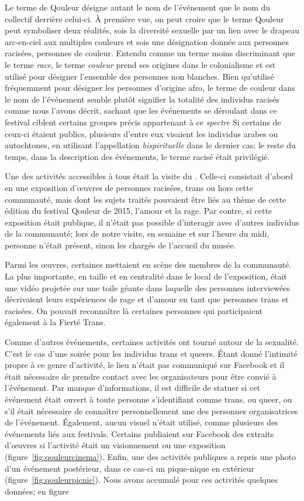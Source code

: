 Le terme de Qouleur désigne autant le nom de l'événement que le nom du collectif derrière celui-ci.
À première vue, on peut croire que le terme Qouleur peut symboliser deux réalités, sois la diversité sexuelle par un lien avec le drapeau arc-en-ciel aux multiples couleurs et sois une désignation donnée aux personnes racisées, personnes de couleur.
Entendu comme un terme moins discriminant que le terme \emph{race}, le terme \emph{couleur} prend ses origines dans le colonialisme et est utilisé pour désigner l'ensemble des personnes non blanches.
Bien qu'utilisé fréquemment pour désigner les personnes d'origine afro, le terme de couleur dans le nom de l'événement semble plutôt signifier la totalité des individus racisés comme nous l’avons décrit, sachant que les événements se déroulant dans ce festival ciblent certains groupes précis appartenant à ce \emph{spectre}
Si certains de ceux-ci étaient publics, plusieurs d'entre eux visaient les individus arabes ou autochtones, en utilisant l'appellation \emph{bispirituelle} dans le dernier cas; le reste du temps, dans la description des événements, le terme racisé était privilégié.

Une des activités accessibles à tous était la visite du \mai{}.
Celle-ci consistait d'abord en une exposition d'œuvres de personnes racisées, trans ou hors cette communauté, mais dont les sujets traités pouvaient être liés au thème de cette édition du festival Qouleur de 2015, l'amour et la rage.
Par contre, si cette exposition était publique, il n'était pas possible d'interagir avec d'autres individus de la communauté; lors de notre visite, en semaine et sur l'heure du midi, personne n'était présent, sinon les chargés de l'accueil du musée.

Parmi les œuvres, certaines mettaient en scène des membres de la communauté.
La plus importante, en taille et en centralité dans le local de l'exposition, était une vidéo projetée sur une toile géante dans laquelle des personnes interviewées décrivaient leurs expériences de rage et d'amour en tant que personnes trans et racisées.
On pouvait reconnaître là certaines personnes qui participaient également à la Fierté Trans.

Comme d'autres événements, certaines activités ont tourné autour de la sexualité.
C'est le cas d'une soirée \bdsm{} pour les individus trans et queers.
Étant donné l'intimité propre à ce genre d'activité, le lieu n'était pas communiqué sur Facebook et il était nécessaire de prendre contact avec les organisateurs pour être convié à l'événement.
Par manque d'informations, il est difficile de statuer si cet événement était ouvert à toute personne s'identifiant comme trans, ou queer, ou s’il était nécessaire de connaître personnellement une des personnes organisatrices de l'événement.
Également, aucun visuel n'était utilisé, comme plusieurs des événements liés aux festivals.
Certains publiaient sur Facebook des extraits d'œuvres si l'activité était un visionnement ou une exposition (figure~\ref{fig:qouleurcinema}).
Enfin, une des activités publiques a repris une photo d'un événement postérieur, dans ce cas-ci un pique-nique en extérieur (figure~\ref{fig:qouleurpicnic}).
Nous avons accumulé pour ces activités quelques données; en figure

